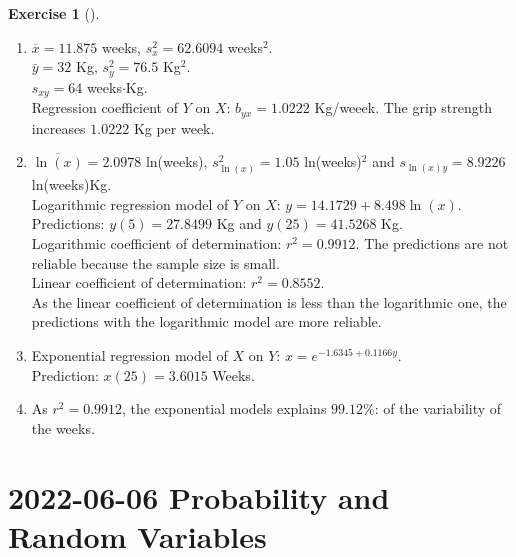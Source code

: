 \documentclass[
  a4paper,
]{scrreport}
\theoremstyle{definition}
\newtheorem{exercise}{Exercise}[chapter]
\theoremstyle{remark}
\begin{document}
\begin{exercise}[]
\begin{tcolorbox}
\begin{enumerate}
\def\labelenumi{\alph{enumi}.}
\item
  \(\overline{x}=11.875\) weeks, \(s_x^2=62.6094\) weeks\(^2\).\\
  \(\bar y=32\) Kg, \(s_y^2=76.5\) Kg\(^2\).\\
  \(s_{xy}=64\) weeks\(\cdot\)Kg.\\
  Regression coefficient of \(Y\) on \(X\): \(b_{yx} = 1.0222\)
  Kg/weeek. The grip strength increases \(1.0222\) Kg per week.
\item
  \(\overline{\ln(x)} = 2.0978\) ln(weeks), \(s_{\ln(x)}^2 = 1.05\)
  ln(weeks)\(^2\) and \(s_{\ln(x)y} = 8.9226\) ln(weeks)Kg.\\
  Logarithmic regression model of \(Y\) on \(X\):
  \(y = 14.1729 + 8.498 \ln(x)\).\\
  Predictions: \(y(5) = 27.8499\) Kg and \(y(25) = 41.5268\) Kg.\\
  Logarithmic coefficient of determination: \(r^2 = 0.9912\). The
  predictions are not reliable because the sample size is small.\\
  Linear coefficient of determination: \(r^2 = 0.8552\).\\
  As the linear coefficient of determination is less than the
  logarithmic one, the predictions with the logarithmic model are more
  reliable.
\item
  Exponential regression model of \(X\) on \(Y\):
  \(x = e^{-1.6345 + 0.1166y}\).\\
  Prediction: \(x(25)=3.6015\) Weeks.
\item
  As \(r^2 = 0.9912\), the exponential models explains \(99.12\)\%: of
  the variability of the weeks.\\
\end{enumerate}

\end{tcolorbox}

\end{exercise}


\hypertarget{probability-and-random-variables-1}{%
\chapter{\texorpdfstring{2022-06-06 Probability and Random
Variables}{2022-06-06  Probability and Random Variables}}\label{probability-and-random-variables-1}}
\end{document}
